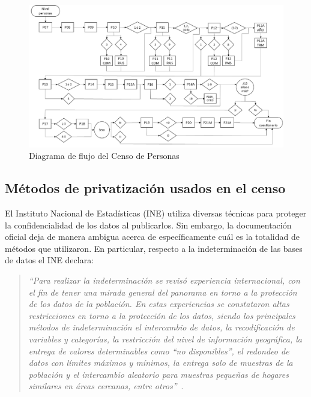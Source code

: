 \documentclass[informe]{upropuesta}
\begin{document}
\begin{figure}[H] %
    \centering
    \includegraphics[width=\linewidth]{imagenes/investigacion/flujo_censo_personas.pdf}
    \caption{Diagrama de flujo del Censo de Personas~\cite{INE2017}}
    \label{fig:flujoPersonas}
\end{figure}


\subsection{Métodos de privatización usados en el censo}
El Instituto Nacional de Estadísticas (INE) utiliza diversas técnicas para proteger la confidencialidad de los datos al publicarlos. Sin embargo, la documentación oficial deja de manera ambigua acerca de específicamente cuál es la totalidad de métodos que utilizaron. En particular, respecto a la indeterminación de las bases de datos el INE declara:

\begin{quote}
    \textit{“Para realizar la indeterminación se revisó experiencia internacional, con el fin de tener una mirada general del panorama en torno a la protección de los datos de la población. En estas experiencias se constataron altas restricciones en torno a la protección de los datos, siendo los principales métodos de indeterminación el intercambio de datos, la recodificación de variables y categorías, la restricción del nivel de información geográfica, la entrega de valores determinables como “no disponibles”, el redondeo de datos con límites máximos y mínimos, la entrega solo de muestras de la población y el intercambio aleatorio para muestras pequeñas de hogares similares en áreas cercanas, entre otros”}~\cite{INE2017}. 
\end{quote}
\end{document}
